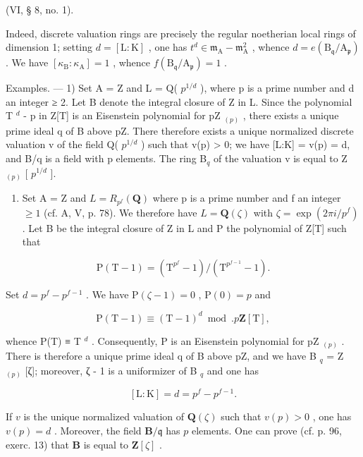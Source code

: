 (VI, § 8, no. 1).

Indeed, discrete valuation rings are precisely the regular noetherian local rings of dimension 1; setting \(d = [\mathrm{L}:\mathrm{K}]\) , one has \(t^{d}\in\mathfrak{m}_{\mathrm{A}}-\mathfrak{m}_{\mathrm{A}}^{2}\) , whence \(d=e(\mathrm{B}_{\mathfrak{q}}/\mathrm{A}_{\mathfrak{p}})\) . We have \([\kappa_{\mathrm{B}}:\kappa_{\mathrm{A}}]=1\) , whence \(f(\mathrm{B}_{\mathfrak{q}}/\mathrm{A}_{\mathfrak{p}})=1\) .

Examples. --- 1) Set A = Z and L = Q( \(p^{1/d}\) ), where p is a prime number and d an integer ≥ 2. Let B denote the integral closure of Z in L. Since the polynomial T \(^{d}\) - p in Z{[}T{]} is an Eisenstein polynomial for pZ \(_{(p)}\) , there exists a unique prime ideal q of B above pZ. There therefore exists a unique normalized discrete valuation v of the field Q( \(p^{1/d}\) ) such that v(p) \textgreater{} 0; we have {[}L:K{]} = v(p) = d, and B/q is a field with p elements. The ring B\(_{q}\) of the valuation v is equal to Z \(_{(p)}\) {[} \(p^{1/d}\) {]}.

\begin{enumerate}
\def\labelenumi{\arabic{enumi})}
\setcounter{enumi}{1}
\tightlist
\item
  Set A = Z and \(L = R_{p^{f}}(\mathbf{Q})\) where p is a prime number and f an integer \(\geqslant 1\) (cf. A, V, p. 78). We therefore have \(L = \mathbf{Q}(\zeta)\) with \(\zeta = \exp(2\pi i/p^{f})\) . Let B be the integral closure of Z in L and P the polynomial of Z{[}T{]} such that
\end{enumerate}

\[
\mathrm{P} (\mathrm{T} - 1) = \left(\mathrm{T} ^ {p^{f}} - 1\right) / \left(\mathrm{T} ^ {p^{f - 1}} - 1\right).
\]

Set \(d = p^{f} - p^{f - 1}\) . We have \(\mathrm{P}(\zeta - 1) = 0\) , \(\mathrm{P}(0) = p\) and

\[
\mathrm{P} (\mathrm{T} - 1) \equiv (\mathrm{T} - 1) ^ {d} \bmod . p \mathbf {Z} [ \mathrm{T} ],
\]

whence P(T) ≡ T \(^{d}\) . Consequently, P is an Eisenstein polynomial for pZ \(_{(p)}\) . There is therefore a unique prime ideal q of B above pZ, and we have B \(_{q}\) = Z \(_{(p)}\) {[}ζ{]}; moreover, ζ - 1 is a uniformizer of B \(_{q}\) and one has

\[
[ \mathrm{L}: \mathrm{K} ] = d = p ^ {f} - p ^ {f - 1}.
\]

If \(v\) is the unique normalized valuation of \(\mathbf{Q}(\zeta)\) such that \(v(p)>0\) , one has \(v(p)=d\) . Moreover, the field \(\mathbf{B}/\mathfrak{q}\) has \(p\) elements. One can prove (cf. p. 96, exerc. 13) that \(\mathbf{B}\) is equal to \(\mathbf{Z}[\zeta]\) .



